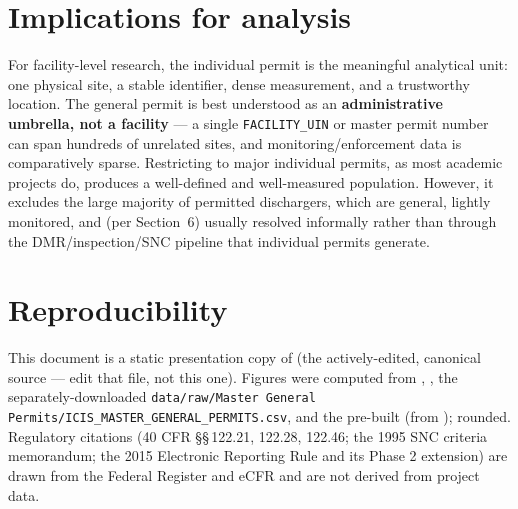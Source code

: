 \documentclass[11pt]{article}
\begin{document}
\section{Implications for analysis}

For facility-level research, the individual permit is the meaningful analytical
unit: one physical site, a stable identifier, dense measurement, and a
trustworthy location. The general permit is best understood as an
\textbf{administrative umbrella, not a facility} --- a single
\texttt{FACILITY\_UIN} or master permit number can span hundreds of unrelated
sites, and monitoring/enforcement data is comparatively sparse. Restricting to
major individual permits, as most academic projects do, produces a well-defined
and well-measured population. However, it excludes the large majority of
permitted dischargers, which are general, lightly monitored, and (per
Section~6) usually resolved informally rather than through the
DMR/inspection/SNC pipeline that individual permits generate.

\section*{Reproducibility}
This document is a static presentation copy of 
(the actively-edited, canonical source --- edit that file, not this one).
Figures were computed from ,
, the separately-downloaded
\texttt{data/raw/Master General Permits/ICIS\_MASTER\_GENERAL\_PERMITS.csv}, and
the pre-built  (from
);
rounded. Regulatory citations (40 CFR \S\S\,122.21, 122.28, 122.46; the 1995 SNC
criteria memorandum; the 2015 Electronic Reporting Rule and its Phase 2
extension) are drawn from the Federal Register and eCFR and are not derived from
project data.
\end{document}
